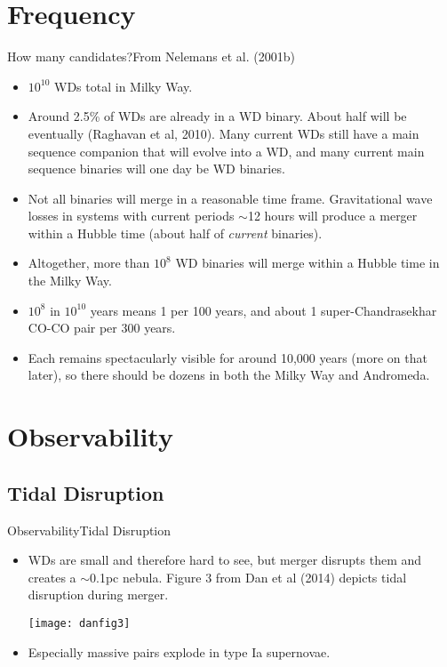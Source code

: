 \documentclass{beamer}
\begin{document}
\section{Frequency}

\begin{frame}{How many candidates?}{From Nelemans et al. (2001b)}
  \begin{itemize}
    \item {$10^{10}$ WDs total in Milky Way.}
    \item {Around 2.5\% of WDs are already in a WD binary. About half will be eventually (Raghavan et al, 2010). Many current WDs still have a main sequence companion that will evolve into a WD, and many current main sequence binaries will one day be WD binaries.}
    \item {Not all binaries will merge in a reasonable time frame. Gravitational wave losses in systems with current periods $\sim$12 hours will produce a merger within a Hubble time (about half of {\it current} binaries).}
    \item {Altogether, more than $10^8$ WD binaries will merge within a Hubble time in the Milky Way.}
    \item {$10^8$ in $10^{10}$ years means 1 per 100 years, and about 1 super-Chandrasekhar CO-CO pair per 300 years.}
    \item {Each remains spectacularly visible for around 10,000 years (more on that later), so there should be dozens in both the Milky Way and Andromeda.}
  \end{itemize}
\end{frame}

\section{Observability}

\subsection{Tidal Disruption}

\begin{frame}{Observability}{Tidal Disruption}
  \begin{itemize}
    \item {WDs are small and therefore hard to see, but merger disrupts them and creates a $\sim$0.1pc nebula. Figure 3 from Dan et al (2014) depicts tidal disruption during merger.}
      \begin{center}\texttt{[image: danfig3]}\end{center}
    \item {Especially massive pairs explode in type Ia supernovae.}
  \end{itemize}
\end{frame}
\end{document}
